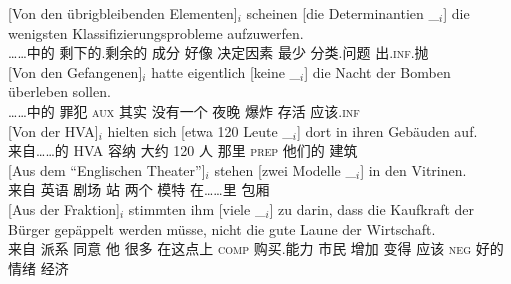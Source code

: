 \begin{sloppypar}
\eal
\ex 
\gll {}[Von den übrigbleibenden Elementen]$_i$ scheinen [die Determinantien \_$_i$] die wenigsten Klassifizierungsprobleme aufzuwerfen.\footnotemark\\
     \spacebr{}……中的  剩下的.剩余的 成分 好像 \spacebr{} 决定因素 {}  最少 分类.问题 出.\textsc{inf}.抛\\
\ex\label{bsp-von-den-gefangenen} 
\gll {}[Von den Gefangenen]$_i$ hatte eigentlich [keine \_$_i$] die Nacht der Bomben überleben sollen.\footnotemark\\
	 {}\spacebr{}……中的  罪犯 \textsc{aux} 其实 \spacebr{}没有一个 {}  夜晚  爆炸 存活 应该.\textsc{inf}\\
\ex 
\gll {}[Von der HVA]$_i$ hielten sich [etwa 120 Leute \_$_i$] dort in ihren Gebäuden auf.\footnotemark\\
	 {}\spacebr{}来自……的  HVA 容纳  \spacebr{}大约 120 人 {} 那里 \textsc{prep} 他们的 建筑 \prt{}\\
\ex 
\gll {}[Aus dem "`Englischen Theater"']$_i$ stehen [zwei Modelle \_$_i$] in den Vitrinen.\footnotemark\hspace{-3pt}\\
	 {}\spacebr{}来自  英语 剧场 站 \spacebr{}两个 模特 {} 在……里  包厢\\
\ex 
\gll {}[Aus der Fraktion]$_i$ stimmten ihm [viele \_$_i$] zu darin, dass die Kaufkraft der Bürger gepäppelt werden müsse, nicht die gute Laune der Wirtschaft.\footnotemark\\
	 {}\spacebr{}来自  派系 同意 他 \spacebr{}很多 {} \prt{} 在这点上 \textsc{comp}  购买.能力  市民 增加 变得 应该 \textsc{neg}  好的 情绪  经济\\

\end{sloppypar}
